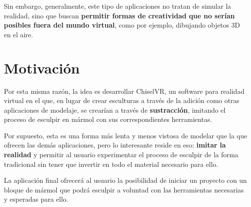
Sin embargo, generalmente, este tipo de aplicaciones no tratan de simular la realidad, sino que buscan \textbf{permitir formas de creatividad que no serían posibles fuera del mundo virtual}, como por ejemplo, dibujando objetos 3D en el aire.

\section{Motivación}

Por esta misma razón, la idea es desarrollar ChiselVR, un software para realidad virtual en el que, en lugar de crear esculturas a través de la adición como otras aplicaciones de modelaje, se crearían a través de \textbf{sustracción}, imitando el proceso de esculpir en mármol con sus correspondientes herramientas.

Por supuesto, esta es una forma más lenta y menos vistosa de modelar que la que ofrecen las demás aplicaciones, pero lo interesante reside en eso: \textbf{imitar la realidad} y permitir al usuario experimentar el proceso de esculpir de la forma tradicional sin tener que invertir en todo el material necesario para ello.

La aplicación final ofrecerá al usuario la posibilidad de iniciar un proyecto con un bloque de mármol que podrá esculpir a voluntad con las herramientas necesarias y esperadas para ello.